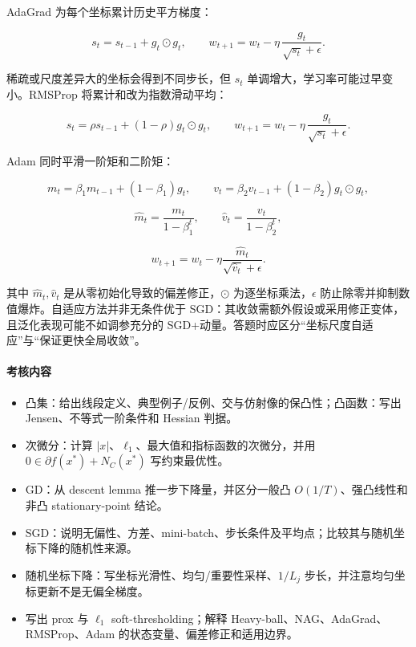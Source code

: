 \documentclass[11pt]{ctexart}
\begin{document}
AdaGrad 为每个坐标累计历史平方梯度：

\[
  s_t=s_{t-1}+g_t\odot g_t,
  \qquad
  w_{t+1}=w_t-\eta\,\frac{g_t}{\sqrt{s_t}+\epsilon}.
\]

稀疏或尺度差异大的坐标会得到不同步长，但 \(s_t\) 单调增大，学习率可能过早变小。RMSProp 将累计和改为指数滑动平均：

\[
  s_t=\rho s_{t-1}+(1-\rho)g_t\odot g_t,
  \qquad
  w_{t+1}=w_t-\eta\,\frac{g_t}{\sqrt{s_t}+\epsilon}.
\]

Adam 同时平滑一阶矩和二阶矩：

\[
  m_t=\beta_1m_{t-1}+(1-\beta_1)g_t,
  \qquad
  v_t=\beta_2v_{t-1}+(1-\beta_2)g_t\odot g_t,
\]

\[
  \widehat m_t=\frac{m_t}{1-\beta_1^t},
  \qquad
  \widehat v_t=\frac{v_t}{1-\beta_2^t},
\]

\[
  w_{t+1}
  =
  w_t
  -
  \eta
  \frac{\widehat m_t}{\sqrt{\widehat v_t}+\epsilon}.
\]

其中 \(\widehat m_t,\widehat v_t\) 是从零初始化导致的偏差修正，\(\odot\) 为逐坐标乘法，\(\epsilon\) 防止除零并抑制数值爆炸。自适应方法并非无条件优于 SGD：其收敛需额外假设或采用修正变体，且泛化表现可能不如调参充分的 SGD+动量。答题时应区分“坐标尺度自适应”与“保证更快全局收敛”。

\paragraph{考核内容}

\begin{itemize}
  \item 凸集：给出线段定义、典型例子/反例、交与仿射像的保凸性；凸函数：写出 Jensen、不等式一阶条件和 Hessian 判据。
  \item 次微分：计算 \(|x|\)、\(\ell_1\)、最大值和指标函数的次微分，并用 \(0\in\partial f(x^*)+N_C(x^*)\) 写约束最优性。
  \item GD：从 descent lemma 推一步下降量，并区分一般凸 \(O(1/T)\)、强凸线性和非凸 stationary-point 结论。
  \item SGD：说明无偏性、方差、mini-batch、步长条件及平均点；比较其与随机坐标下降的随机性来源。
  \item 随机坐标下降：写坐标光滑性、均匀/重要性采样、\(1/L_j\) 步长，并注意均匀坐标更新不是无偏全梯度。
  \item 写出 prox 与 \(\ell_1\) soft-thresholding；解释 Heavy-ball、NAG、AdaGrad、RMSProp、Adam 的状态变量、偏差修正和适用边界。
\end{itemize}
\end{document}
